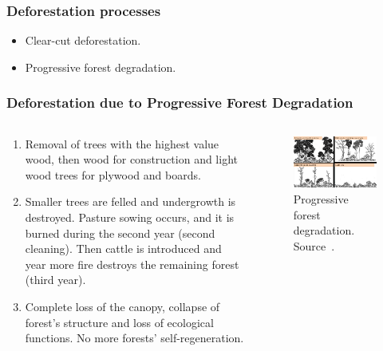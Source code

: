 \documentclass[aspectratio=169]{beamer}
\begin{document}
\begin{frame}
    \frametitle{Deforestation processes}
    \begin{itemize}
        \item Clear-cut deforestation.
        \item Progressive forest degradation.
    \end{itemize}
\end{frame}

\begin{frame}
    \frametitle{Deforestation due to Progressive Forest Degradation}
    \begin{columns}
        \begin{column}{0.5\textwidth}
            \begin{enumerate}
                \item Removal of trees with the highest value wood, then
                    wood for construction and light wood trees for plywood and
                    boards.
                \item Smaller trees are felled and undergrowth is destroyed.
                    Pasture sowing occurs, and it is burned during the second
                    year (second cleaning). Then cattle is introduced and
                    year more fire destroys the remaining forest (third year).
                \item Complete loss of the canopy, collapse of forest's
                    structure and loss of ecological functions. No more
                    forests' self-regeneration.
            \end{enumerate}
        \end{column}
        \begin{column}{0.5\textwidth}
            \begin{figure}[h] 
                \includegraphics[width=0.9\linewidth]
                {./images/progressive_degradation_drawing.png}
                \caption{Progressive forest degradation. 
                Source~\cite{dealmeida2022}.}
            \end{figure}
        \end{column}
    \end{columns}
\end{frame}
\end{document}
